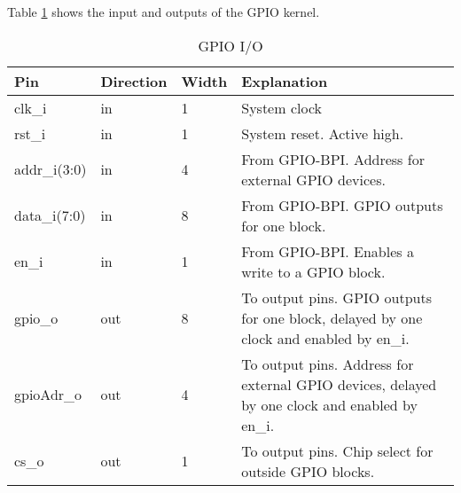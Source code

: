 
Table \ref{tab:asGpioPer04a} shows the input and outputs of the GPIO kernel.
\begin{table}[H]
\caption{GPIO I/O}
\label{tab:asGpioPer04a}
\centering
\begin{tabularx}{\textwidth}{|l |l |l |X|}
  \hline
  Pin & Direction & Width & Explanation \\
  \hline
  \hline
  clk\_i & in & 1 & System clock \\
  \hline
  rst\_i & in & 1 & System reset. Active high. \\
  \hline
  addr\_i(3:0) & in & 4 & From GPIO-BPI. Address for external GPIO devices. \\
  \hline
  data\_i(7:0) & in & 8 &  From GPIO-BPI. GPIO outputs for one block. \\
  \hline
  en\_i & in & 1 &  From GPIO-BPI. Enables a write to a GPIO block. \\
  \hline
  gpio\_o & out & 8 &  To output pins. GPIO outputs for one block, delayed by one clock and enabled by en\_i. \\
  \hline
  gpioAdr\_o & out & 4 &  To output pins. Address for external GPIO devices, delayed by one clock and enabled by en\_i.   \\
  \hline
  cs\_o & out & 1 &  To output pins. Chip select for outside GPIO blocks.   \\
  \hline
\end{tabularx}
\end{table}
